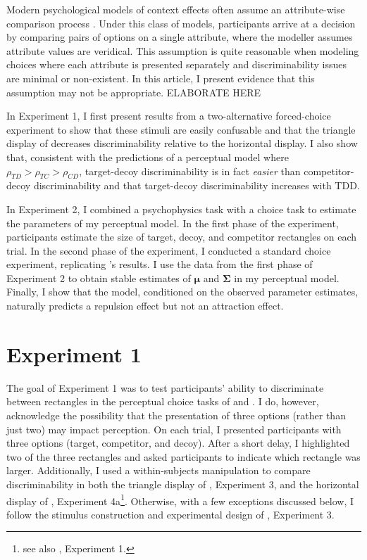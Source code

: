 Modern psychological models of context effects often assume an attribute-wise comparison process \parencite{roeMultialternativeDecisionField2001a,trueblood2013not,usherLossAversionInhibition2004a,bhatiaAssociationsAccumulationPreference2013b}. Under this class of models, participants arrive at a decision by comparing pairs of options on a single attribute, where the modeller assumes attribute values are veridical. This assumption is quite reasonable when modeling choices where each attribute is presented separately and discriminability issues are minimal or non-existent. In this article, I present evidence that this assumption may not be appropriate. ELABORATE HERE

In Experiment 1, I first present results from a two-alternative forced-choice experiment to show that these stimuli are easily confusable and that the triangle display of \textcite{spektorWhenGoodLooks2018b} decreases discriminability relative to the horizontal display. I also show that, consistent with the predictions of a perceptual model where $\rho_{TD}>\rho_{TC}>\rho_{CD}$, target-decoy discriminability is in fact \textit{easier} than competitor-decoy discriminability and that target-decoy discriminability increases with TDD. 

In Experiment 2, I combined a psychophysics task with a choice task to estimate the parameters of my perceptual model. In the first phase of the experiment, participants estimate the size of target, decoy, and competitor rectangles on each trial. In the second phase of the experiment, I conducted a standard choice experiment, replicating \textcite{spektorWhenGoodLooks2018b}'s results. I use the data from the first phase of Experiment 2 to obtain stable estimates of  $\boldsymbol{\mu}$ and $\boldsymbol{\Sigma}$ in my perceptual model. Finally, I show that the model, conditioned on the observed parameter estimates, naturally predicts a repulsion effect but not an attraction effect.  

\section{Experiment 1}

The goal of Experiment 1 was to test participants' ability to discriminate between rectangles in the perceptual choice tasks of \textcite{trueblood2013not} and \textcite{spektorWhenGoodLooks2018b}. I do, however, acknowledge the possibility that the presentation of three options (rather than just two) may impact perception. 
On each trial, I presented participants with three options (target, competitor, and decoy). After a short delay, I highlighted two of the three rectangles and asked participants to indicate which rectangle was larger. 
Additionally, I used a within-subjects manipulation to compare discriminability in both the triangle display of \textcite{spektorWhenGoodLooks2018b}, Experiment 3, and the horizontal display of \textcite{spektorWhenGoodLooks2018b}, Experiment 4a\footnote{see also \textcite{trueblood2013not}, Experiment 1.}. Otherwise, with a few exceptions discussed below, I follow the stimulus construction and experimental design of \textcite{spektorWhenGoodLooks2018b}, Experiment 3. 


